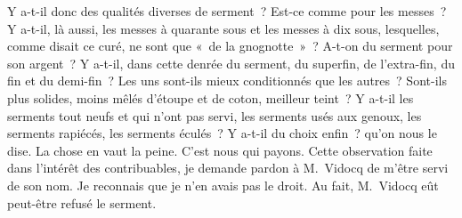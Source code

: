 \documentclass[french,twoside]{book} %
\begin{document}
Y a-t-il donc des qualités diverses de serment ? Est-ce comme pour les messes ? Y a-t-il, là aussi, les messes à quarante sous et les messes à dix sous, lesquelles, comme disait ce curé, ne sont que « de la gnognotte » ? A-t-on du serment pour son argent ? Y a-t-il, dans cette denrée du serment, du superfin, de l’extra-fin, du fin et du demi-fin ? Les uns sont-ils mieux conditionnés que les autres ? Sont-ils plus solides, moins mêlés d’étoupe et de coton, meilleur teint ? Y a-t-il les serments tout neufs et qui n’ont pas servi, les serments usés aux genoux, les serments rapiécés, les serments éculés ? Y a-t-il du choix enfin ? qu’on nous le dise. La chose en vaut la peine. C’est nous qui payons. Cette observation faite dans l’intérêt des contribuables, je demande pardon à M. Vidocq de m’être servi de son nom. Je reconnais que je n’en avais pas le droit. Au fait, M. Vidocq eût peut-être refusé le serment.
\end{document}
